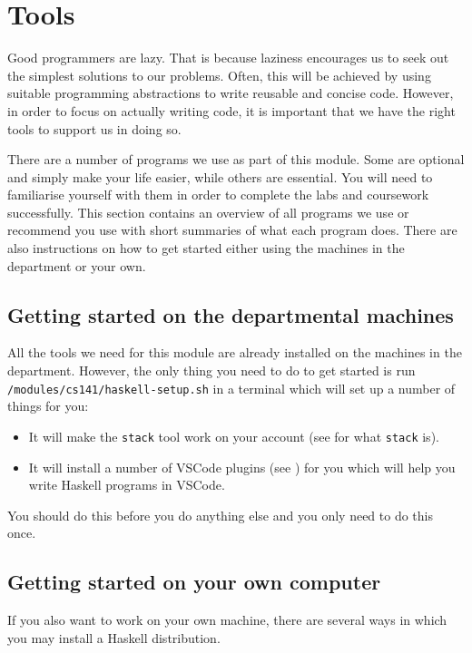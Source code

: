 \chapter{Tools}
\label{ch:tools}

Good programmers are lazy. That is because laziness encourages us to seek out the simplest solutions to our problems. Often, this will be achieved by using suitable programming abstractions to write reusable and concise code. However, in order to focus on actually writing code, it is important that we have the right tools to support us in doing so. 

There are a number of programs we use as part of this module. Some are optional and simply make your life easier, while others are essential. You will need to familiarise yourself with them in order to complete the labs and coursework successfully. This section contains an overview of all programs we use or recommend you use with short summaries of what each program does. There are also instructions on how to get started either using the machines in the department or your own.

\section{Getting started on the departmental machines}
\label{sec:department-setup}

All the tools we need for this module are already installed on the machines in the department. However, the only thing you need to do to get started is run \texttt{\small /modules/cs141/haskell-setup.sh} in a terminal which will set up a number of things for you:
\begin{itemize}
	\item It will make the \texttt{\small stack} tool work on your account (see  for what \texttt{\small stack} is).
	\item It will install a number of VSCode plugins (see ) for you which will help you write Haskell programs in VSCode. 
\end{itemize}
You should do this before you do anything else and you only need to do this once.

\section{Getting started on your own computer}
\label{sec:home-setup}

If you also want to work on your own machine, there are several ways in which you may install a Haskell distribution.

